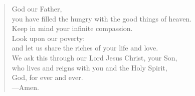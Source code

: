 \prayer

\setlength{\leftmargini}{\prayerleftmargini}

\begin{verse}
God our Father,\\
you have filled the hungry with the good things of heaven.\\
Keep in mind your infinite compassion.\\
Look upon our poverty:\\
and let us share the riches of your life and love.\\
We ask this through our Lord Jesus Christ, your Son,\\
who lives and reigns with you and the Holy Spirit,\\
God, for ever and ever.\\
{\color{red}---\thinspace}Amen.
\end{verse}

\setlength{\leftmargini}{\defleftmargini}